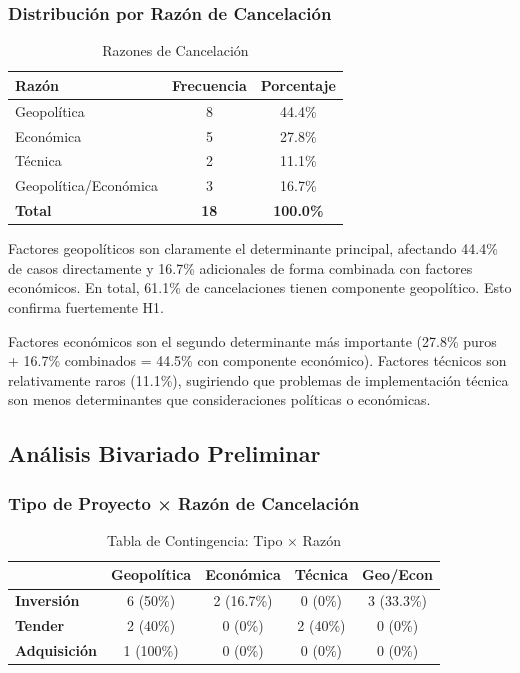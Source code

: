 \documentclass[12pt]{article}
\begin{document}
\subsubsection{Distribución por Razón de Cancelación}

\begin{table}[H]
\centering
\caption{Razones de Cancelación}
\label{tab:razon}
\begin{tabular}{lcc}
\toprule
\textbf{Razón} & \textbf{Frecuencia} & \textbf{Porcentaje} \\
\midrule
Geopolítica & 8 & 44.4\% \\
Económica & 5 & 27.8\% \\
Técnica & 2 & 11.1\% \\
Geopolítica/Económica & 3 & 16.7\% \\
\midrule
\textbf{Total} & \textbf{18} & \textbf{100.0\%} \\
\bottomrule
\end{tabular}
\end{table}

Factores geopolíticos son claramente el determinante principal, afectando 44.4\% de casos directamente y 16.7\% adicionales de forma combinada con factores económicos. En total, 61.1\% de cancelaciones tienen componente geopolítico. Esto confirma fuertemente H1.

Factores económicos son el segundo determinante más importante (27.8\% puros + 16.7\% combinados = 44.5\% con componente económico). Factores técnicos son relativamente raros (11.1\%), sugiriendo que problemas de implementación técnica son menos determinantes que consideraciones políticas o económicas.

\subsection{Análisis Bivariado Preliminar}

\subsubsection{Tipo de Proyecto × Razón de Cancelación}

\begin{table}[H]
\centering
\caption{Tabla de Contingencia: Tipo × Razón}
\label{tab:tipo_razon}
\scriptsize
\begin{tabular}{lcccc}
\toprule
 & \textbf{Geopolítica} & \textbf{Económica} & \textbf{Técnica} & \textbf{Geo/Econ} \\
\midrule
\textbf{Inversión} & 6 (50\%) & 2 (16.7\%) & 0 (0\%) & 3 (33.3\%) \\
\textbf{Tender} & 2 (40\%) & 0 (0\%) & 2 (40\%) & 0 (0\%) \\
\textbf{Adquisición} & 1 (100\%) & 0 (0\%) & 0 (0\%) & 0 (0\%) \\
\bottomrule
\end{tabular}
\end{table}
\end{document}
